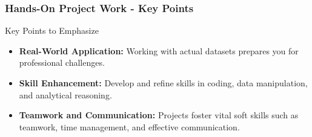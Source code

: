 \documentclass[aspectratio=169]{beamer}
\begin{document}
\begin{frame}[fragile]
    \frametitle{Hands-On Project Work - Key Points}
    \begin{block}{Key Points to Emphasize}
        \begin{itemize}
            \item \textbf{Real-World Application:} 
            Working with actual datasets prepares you for professional challenges.
            \item \textbf{Skill Enhancement:}
            Develop and refine skills in coding, data manipulation, and analytical reasoning.
            \item \textbf{Teamwork and Communication:}
            Projects foster vital soft skills such as teamwork, time management, and effective communication.
        \end{itemize}
    \end{block}
\end{frame}
\end{document}
